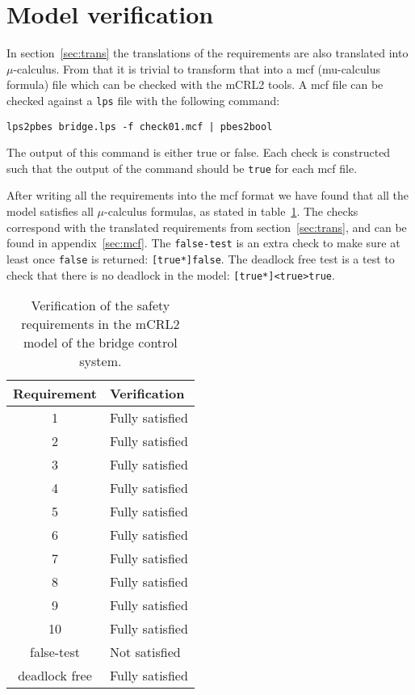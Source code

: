 \section{Model verification}
\label{sec:check}

In section~\ref{sec:trans} the translations of the requirements are also
translated into $\mu$-calculus. From that it is trivial to transform that into
a mcf (mu-calculus formula) file which can be checked with the mCRL2 tools. A
mcf file can be checked against a \texttt{lps} file with the following command:

\begin{verbatim}
lps2pbes bridge.lps -f check01.mcf | pbes2bool
\end{verbatim}

The output of this command is either true or false. Each check is constructed such
that the output of the command should be \texttt{true} for each mcf file.

After writing all the requirements into the mcf format we have found that all
the model satisfies all $\mu$-calculus formulas, as stated in
table~\ref{tab:checks}. The checks correspond with the translated requirements
from section~\ref{sec:trans}, and can be found in appendix~\ref{sec:mcf}. The
\texttt{false-test} is an extra check to make sure at least once \texttt{false}
is returned: \texttt{[true*]false}. The deadlock free test is a test to check
that there is no deadlock in the model: \texttt{[true*]<true>true}.

\begin{table}[htb]%
\centering
\begin{tabular}{|c|l|}
	\hline
	\textbf{Requirement} & \textbf{Verification}\\
	\hline
	1 & Fully satisfied\\
	2 & Fully satisfied\\
	3 & Fully satisfied\\
	4 & Fully satisfied\\
	5 & Fully satisfied\\
	6 & Fully satisfied\\
	7 & Fully satisfied\\
	8 & Fully satisfied\\
	9 & Fully satisfied\\
	10 & Fully satisfied\\
	\hline
	false-test & Not satisfied\\
	deadlock free & Fully satisfied\\
	\hline
\end{tabular}
\caption{Verification of the safety requirements in the mCRL2 model of the bridge control system.}
\label{tab:checks}
\end{table}

